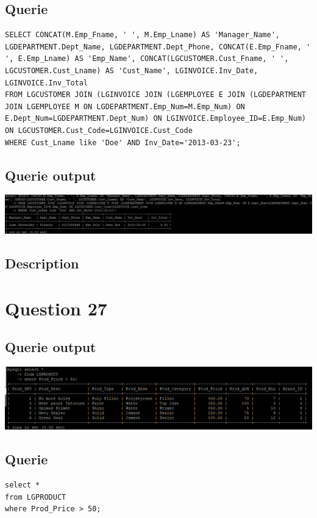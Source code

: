 \documentclass[a4paper,10pt]{article}
\begin{document}
 \subsection{Querie}
          \lstset{
            language=SQL,
            breaklines=true
            }
        \begin{lstlisting}[frame=single]
        SELECT CONCAT(M.Emp_Fname, ' ', M.Emp_Lname) AS 'Manager_Name', LGDEPARTMENT.Dept_Name, LGDEPARTMENT.Dept_Phone, CONCAT(E.Emp_Fname, ' ', E.Emp_Lname) AS 'Emp_Name', CONCAT(LGCUSTOMER.Cust_Fname, ' ', LGCUSTOMER.Cust_Lname) AS 'Cust_Name', LGINVOICE.Inv_Date, LGINVOICE.Inv_Total
FROM LGCUSTOMER JOIN (LGINVOICE JOIN (LGEMPLOYEE E JOIN (LGDEPARTMENT JOIN LGEMPLOYEE M ON LGDEPARTMENT.Emp_Num=M.Emp_Num) ON E.Dept_Num=LGDEPARTMENT.Dept_Num) ON LGINVOICE.Employee_ID=E.Emp_Num) ON LGCUSTOMER.Cust_Code=LGINVOICE.Cust_Code
WHERE Cust_Lname like 'Doe' AND Inv_Date='2013-03-23';

        \end{lstlisting}
\subsection{Querie output}
           \includegraphics{Queries/Question_26/Q26_screenshot.jpg}
\subsection{Description}\section*{Question 27}
\subsection{Querie output}
           \includegraphics{Queries/Question_27/Question_27_screenshot.PNG}
 \subsection{Querie}
          \lstset{
            language=SQL,
            breaklines=true
            }
        \begin{lstlisting}[frame=single]
        select * 
from LGPRODUCT 
where Prod_Price > 50;
        \end{lstlisting}
\end{document}

